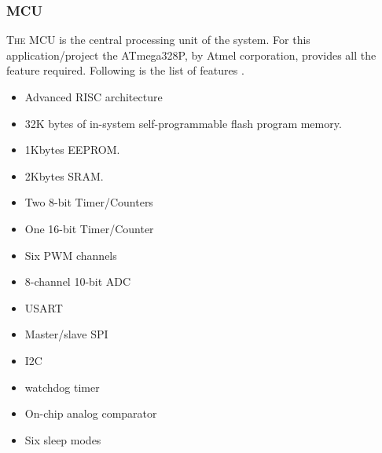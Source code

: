 
\subsubsection{MCU}

	 \lettrine{T}{he} MCU is the central processing unit of the system. For this application/project the ATmega328P, by Atmel corporation, provides all the feature required. Following is the list of features \cite{AtMega328P}.
	 
	 \begin{itemize}
		\item Advanced RISC architecture
		\item 32K bytes of in-system self-programmable flash program memory.
		\item 1Kbytes EEPROM.
		\item 2Kbytes SRAM.
		\item Two 8-bit Timer/Counters
		\item One 16-bit Timer/Counter
		\item Six PWM channels
		\item 8-channel 10-bit ADC
		\item USART
		\item Master/slave SPI
		\item I2C
		\item watchdog timer
		\item On-chip analog comparator
		\item Six sleep modes 
		
		
			
		
		
	\end{itemize}	  
	 
	 

